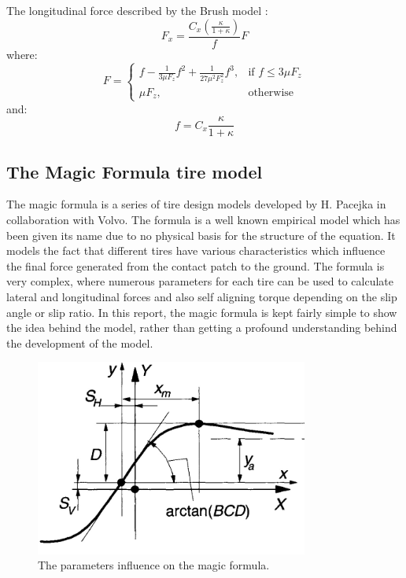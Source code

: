 \pagebreak
The longitudinal force described by the Brush model \cite{pacejka}:
\begin{equation}
	F_{x} = \frac{C_{x}(\frac{\kappa}{1+\kappa})}{f}F
\end{equation}
where:
\begin{equation}
F = 
\begin{cases}
f-\frac{1}{3\mu F_{z}}f^{2}+\frac{1}{27\mu^{2}F_{z}^{2}}f^{3}, & \text{if } f \leq 3\mu F_{z} \\
\mu F_{z}, & \text{otherwise}
\end{cases}
\end{equation}
and:
\begin{equation}
	f = C_{x}\frac{\kappa}{1+\kappa}
\end{equation}

\subsection{The Magic Formula tire model}
The magic formula is a series of tire design models developed by H. Pacejka \cite{pacejka} in collaboration with Volvo. The formula is a well known empirical model which has been given its name due to no physical basis for the structure of the equation. It models the fact that different tires have various characteristics which influence the final force generated from the contact patch to the ground. The formula is very complex, where numerous parameters for each tire can be used to calculate lateral and longitudinal forces and also self aligning torque depending on the slip angle or slip ratio. In this report, the magic formula is kept fairly simple to show the idea behind the model, rather than getting a profound understanding behind the development of the model.


\begin{figure}[h]
	\centering
	\includegraphics[width=0.8\textwidth]{Pictures/magic_formula}
	\caption{The parameters influence on the magic formula. \cite{pacejka}}
	\label{magic_formula}
\end{figure}

